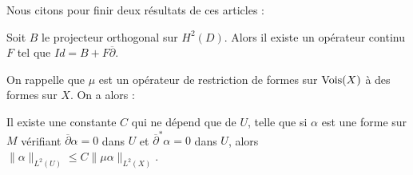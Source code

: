 Nous citons pour finir deux résultats de ces articles :
\begin{prop}
Soit $B$ le projecteur orthogonal sur $H^2(D)$. Alors il existe un opérateur continu $F$ tel que $Id = B + F\overline{\partial}$.
\end{prop}
On rappelle que $\mu$ est un opérateur de restriction de formes sur $\operatorname{Vois}(X)$ à des formes sur $X$. On a alors :
\begin{prop}
Il existe une constante $C$ qui ne dépend que de $U$, telle que si $\alpha$ est une forme sur $M$ vérifiant $\overline{\partial}\alpha=0$ dans $U$ et $\overline{\partial}^{*}\alpha=0$ dans $U$, alors $\|\alpha\|_{L^2(U)} \leq C\|\mu\alpha\|_{L^2(X)}$.
\end{prop}
